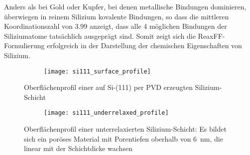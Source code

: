 Anders als bei Gold oder Kupfer, bei denen metallische Bindungen dominieren, überwiegen in reinem Silizium kovalente Bindungen, so dass die mittleren Koordinationszahl von \num{3.99} anzeigt, dass alle 4 möglichen Bindungen der Siliziumatome tatsächlich ausgeprägt sind.
Somit zeigt sich die ReaxFF-Formulierung erfolgreich in der Darstellung der chemischen Eigenschaften von Silizium.

\begin{figure}[H]
  \centering
  \captionsetup[subfigure]{singlelinecheck=false}
  \begin{subfigure}[t]{7.1cm}
    \texttt{[image: si111\_surface\_profile]}
  \end{subfigure}
  \begin{subfigure}[t]{1.7cm}
    \def\svgwidth{\textwidth}
    
  \end{subfigure}
  \caption[Oberflächenprofil einer Silizium-PVD-Schicht]{Oberflächenprofil einer auf Si-(111) per PVD erzeugten Silizium-Schicht}
  \label{fig:siliconprofile}
\end{figure}

\begin{figure}[H]
  \centering
  \captionsetup[subfigure]{singlelinecheck=false}
  \begin{subfigure}[t]{7.1cm}
    \texttt{[image: si111\_underrelaxed\_profile]}
  \end{subfigure}
  \begin{subfigure}[t]{1.7cm}
    \def\svgwidth{\textwidth}
    
  \end{subfigure}
  \caption[Oberflächenprofil einer unterrelaxierten Siliziumschicht]{
    Oberflächenprofil einer unterrelaxierten Silizium-Schicht:
    Es bildet sich ein poröses Material mit Porentiefen oberhalb von \SI{6}{\nano\meter}, die linear mit der Schichtdicke wachsen
  }
  \label{fig:siliconunderrelaxedprofile}
\end{figure}
